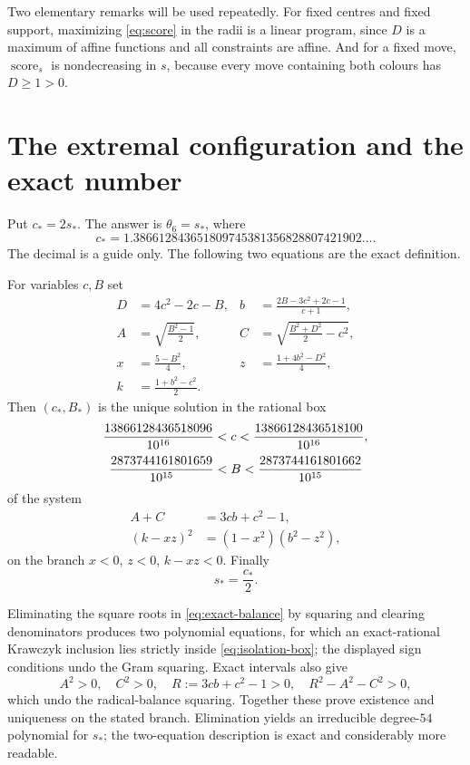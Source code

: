 \documentclass[11pt]{article}
\theoremstyle{plain}
\theoremstyle{definition}
\theoremstyle{remark}
\newcommand{\score}{\operatorname{score}}
\newcommand{\sstar}{s_{\!*}}
\newcommand{\cstar}{c_{\!*}}
\begin{document}
Two elementary remarks will be used repeatedly.  For fixed centres and
fixed support, maximizing \eqref{eq:score} in the radii is a linear
program, since $D$ is a maximum of affine functions and all constraints are
affine.  And for a fixed move, $\score_s$ is nondecreasing in $s$, because
every move containing both colours has $D\ge1>0$.

\section{The extremal configuration and the exact number}\label{sec:number}

Put $\cstar=2\sstar$.  The answer is $\theta_6=\sstar$, where
\[
 \cstar=1.386612843651809745381356828807421902\ldots .
\]
The decimal is a guide only.  The following two equations are the exact
definition.

For variables $c,B$ set
\begin{align*}
 D&=4c^2-2c-B, &b&=\frac{2B-3c^2+2c-1}{c+1},\\
 A&=\sqrt{\frac{B^2-1}{2}}, &C&=\sqrt{\frac{B^2+D^2}{2}-c^2},\\
 x&=\frac{5-B^2}{4}, &z&=\frac{1+4b^2-D^2}{4},\\
 k&=\frac{1+b^2-c^2}{2}.&&
\end{align*}
Then $(\cstar,B_*)$ is the unique solution in the rational box
\begin{align}\label{eq:isolation-box}
 \frac{13866128436518096}{10^{16}}&<c<\frac{13866128436518100}{10^{16}},\notag\\[0.2em]
 \frac{2873744161801659}{10^{15}}&<B<\frac{2873744161801662}{10^{15}}
\end{align}
of the system
\begin{align}
 A+C&=3cb+c^2-1,\label{eq:exact-balance}\\
 (k-xz)^2&=(1-x^2)(b^2-z^2),\label{eq:exact-gram}
\end{align}
on the branch $x<0$, $z<0$, $k-xz<0$.  Finally
\begin{equation}\label{eq:sstar-def}
 \sstar=\frac{\cstar}{2}.
\end{equation}

Eliminating the square roots in \eqref{eq:exact-balance} by squaring and
clearing denominators produces two polynomial equations, for which an
exact-rational Krawczyk inclusion lies strictly inside
\eqref{eq:isolation-box}; the displayed sign conditions undo the Gram
squaring.  Exact intervals also give
\[
 A^2>0,\quad C^2>0,\quad R:=3cb+c^2-1>0,\quad R^2-A^2-C^2>0,
\]
which undo the radical-balance squaring.  Together these prove existence
and uniqueness on the stated branch.  Elimination yields an irreducible
degree-$54$ polynomial for $\sstar$; the two-equation description is exact
and considerably more readable.
\end{document}
